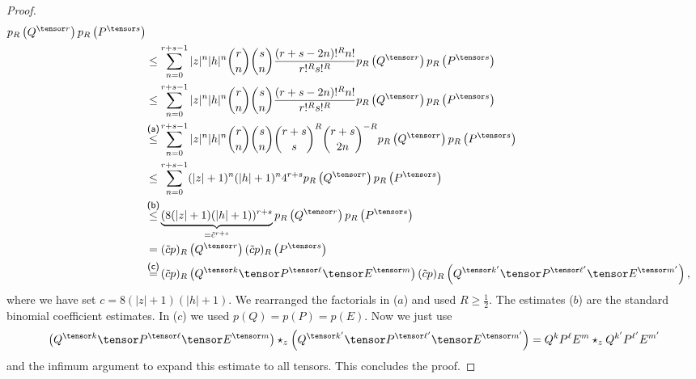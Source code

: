 \begin{proof}
\begin{align*}
        p_R \left(Q^{\tensor r} \right)
        p_R \left(P^{\tensor s} \right)
        \\
        & \leq
        \sum\limits_{n=0}^{r + s - 1}
        |z|^n |h|^n
        \binom{r}{n} \binom{s}{n}
        \frac{(r + s - 2n)!^R n!}{r!^R s!^R}
        p_R \left(Q^{\tensor r} \right)
        p_R \left(P^{\tensor s} \right)
        \\
        & \leq
        \sum\limits_{n=0}^{r + s - 1}
        |z|^n |h|^n
        \binom{r}{n} \binom{s}{n}
        \frac{(r + s - 2n)!^R n!}{r!^R s!^R}
        p_R \left(Q^{\tensor r} \right)
        p_R \left(P^{\tensor s} \right)
        \\
        & \ot{(a)}{\leq}
        \sum\limits_{n=0}^{r + s - 1}
        |z|^n |h|^n
        \binom{r}{n} \binom{s}{n}
        \binom{r + s}{s}^R
        \binom{r + s}{2n}^{-R}
        p_R \left(Q^{\tensor r} \right)
        p_R \left(P^{\tensor s} \right)
        \\
        & \leq
        \sum\limits_{n=0}^{r + s - 1}
        (|z| + 1)^n (|h| + 1)^n
        4^{r + s}
        p_R \left(Q^{\tensor r} \right)
        p_R \left(P^{\tensor s} \right)
        \\
        & \ot{(b)}{ \leq }
        \underbrace{
        (8 (|z| + 1) (|h| + 1))^{r + s}
        }_{ = \tilde{c}^{r + s}}
        p_R \left(Q^{\tensor r} \right)
        p_R \left(P^{\tensor s} \right)
        \\
        & =
        (\tilde{c} p)_R \left(Q^{\tensor r} \right)
        (\tilde{c} p)_R \left(P^{\tensor s} \right)
        \\
        & \ot{(c)}{ = }
        (\tilde{c} p)_R \left(
        Q^{\tensor k} \tensor
        P^{\tensor \ell} \tensor
        E^{\tensor m} \right)
        (\tilde{c} p)_R \left(
        Q^{\tensor k'} \tensor
        P^{\tensor \ell'} \tensor
        E^{\tensor m'} \right),
    \end{align*}
    where we have set $c = 8 (|z| + 1) (|h| + 1)$. We rearranged the factorials in 
    ($a$) and used $R \geq \frac{1}{2}$. The estimates ($b$) are the standard 
    binomial coefficient estimates. In ($c$) we used $p(Q) = p(P) = p(E)$. Now
    we just use
    \begin{equation*}
        \left(
        	Q^{\tensor k} \tensor
        	P^{\tensor \ell} \tensor
        	E^{\tensor m}
        \right)
        \ostar_z
        \left(
        	Q^{\tensor k'} \tensor
        	P^{\tensor \ell'} \tensor
        	E^{\tensor m'}
        \right)
        =
        Q^k P^{\ell} E^m
        \ostar_z
        Q^{k'} P^{\ell'} E^{m'}
    \end{equation*}
    and the infimum argument to expand this estimate to all tensors.
    This concludes the proof.
\end{proof}
